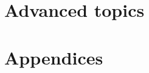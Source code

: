 \documentclass[nofonts, nobib]{tufte-book}
\begin{document}



%

%

\part{Advanced topics} \label{advancedpart}


%
%
%
%




%



\part{Appendices}




\end{document}
